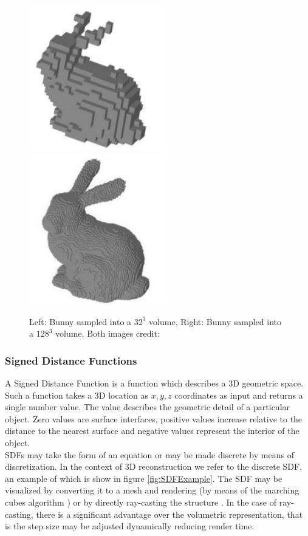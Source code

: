 \begin{figure}[!htb]
\centering
\includegraphics[width=6cm]{images/literature/bunnyVol32}
\includegraphics[width=6cm]{images/literature/bunnyVol128}
\caption{Left: Bunny sampled into a ${32}^3$ volume, Right: Bunny sampled into a ${128}^3$ volume. Both images credit: \cite{Passalis07General}}
\label{fig:VolExamples}
\end{figure}


\subsubsection{Signed Distance Functions}

A Signed Distance Function \cite{Curless96Volumetric} is a function which describes a 3D geometric space. Such a function takes a 3D location as $x,y,z$ coordinates as input and returns a single number value. The value describes the geometric detail of a particular object. Zero values are surface interfaces, positive values increase relative to the distance to the nearest surface and negative values represent the interior of the object. \\

SDFs may take the form of an equation or may be made discrete by means of discretization. In the context of 3D reconstruction we refer to the discrete SDF, an example of which is show in figure \ref{fig:SDFExample}. The SDF may be visualized by converting it to a mesh and rendering (by means of the marching cubes algorithm \cite{Cubes87High}) or by directly ray-casting the structure \cite{Parker98Interactive}. In the case of ray-casting, there is a significant advantage over the volumetric representation, that is the step size may be adjusted dynamically reducing render time. \\


